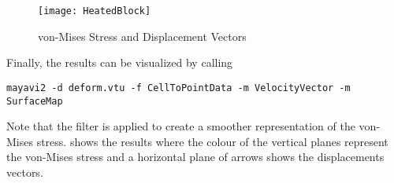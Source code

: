 \begin{figure}
\centerline{\texttt{[image: HeatedBlock]}}
\caption{von-Mises Stress and Displacement Vectors}
\label{HEATEDBLOCK FIG 2}
\end{figure}

\noindent Finally, the results can be visualized by calling
\begin{verbatim}
mayavi2 -d deform.vtu -f CellToPointData -m VelocityVector -m SurfaceMap
\end{verbatim}
Note that the filter  is applied to create a smoother
representation of the von-Mises stress.
 shows the results where the colour of the vertical
planes represent the von-Mises stress and a horizontal plane of arrows shows
the displacements vectors.

